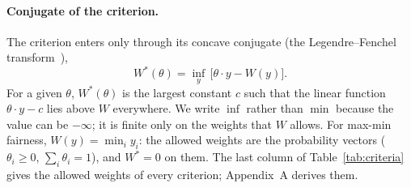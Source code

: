 \documentclass[11pt,a4paper]{article}
\begin{document}
\paragraph{Conjugate of the criterion.} The criterion enters only through its concave conjugate (the
Legendre--Fenchel transform~\cite{fenchel1949conjugate,rockafellar1970convex,boyd2004convex}),
\begin{equation}\label{eq:conj}
W^*(\theta)=\inf_y\,\bigl[\theta\cdot y-W(y)\bigr].
\end{equation}
For a given $\theta$, $W^*(\theta)$ is the largest constant $c$ such that the linear function
$\theta\cdot y-c$ lies above $W$ everywhere. We write $\inf$ rather than $\min$ because the value can
be $-\infty$; it is finite only on the weights that $W$ allows. For max-min fairness, $W(y)=\min_iy_i$:
the allowed weights are the probability vectors ($\theta_i\ge0$, $\sum_i\theta_i=1$), and $W^*=0$ on
them. The last column of Table~\ref{tab:criteria} gives the allowed weights of every criterion;
Appendix~A derives them.
\end{document}
